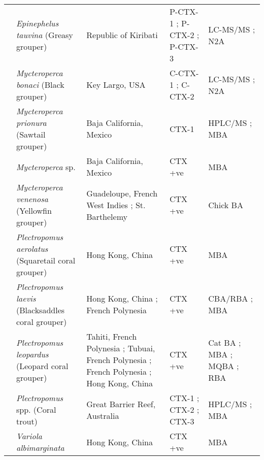 \documentclass[12pt]{article}
\begin{document}
\begin{longtable}{ | p{2cm} | p{3cm} | p{4.5cm} | p{2cm} | p{3cm} | }
	& \emph{Epinephelus tauvina} (Greasy grouper) & Republic of Kiribati \cite{mak2013pacific} & P-CTX-1 \cite{mak2013pacific}; P-CTX-2 \cite{mak2013pacific}; P-CTX-3 \cite{mak2013pacific} & LC-MS/MS \cite{mak2013pacific}; N2A \cite{mak2013pacific} \\
	& \emph{Mycteroperca bonaci} (Black grouper) & Key Largo, USA \cite{dickey2008ciguatera} & C-CTX-1 \cite{dickey2008ciguatera}; C-CTX-2 \cite{dickey2008ciguatera} & LC-MS/MS \cite{dickey2008ciguatera}; N2A \cite{dickey2008ciguatera} \\
	& \emph{Mycteroperca prionura} (Sawtail grouper) & Baja California, Mexico \cite{sierra1998overview} & CTX-1 \cite{sierra1998overview} & HPLC/MS \cite{sierra1998overview}; MBA \cite{sierra1998overview} \\
	& \emph{Mycteroperca} sp. & Baja California, Mexico \cite{lechuga1995documented} & CTX +ve \cite{lechuga1995documented} & MBA \cite{lechuga1995documented} \\
	& \emph{Mycteroperca venenosa} (Yellowfin grouper) & Guadeloupe, French West Indies \cite{}; St. Barthelemy \cite{} & CTX +ve \cite{} & Chick BA \cite{}\\
	& \emph{Plectropomus aerolatus} (Squaretail coral grouper) & Hong Kong, China \cite{wong2005study} & CTX +ve \cite{wong2005study} & MBA \cite{wong2005study} \\
	& \emph{Plectropomus laevis} (Blacksaddles coral grouper) & Hong Kong, China \cite{wong2008features}; French Polynesia \cite{chinain2014mail} & CTX +ve \cite{wong2008features,chinain2014mail} & CBA/RBA \cite{chinain2014mail}; MBA \cite{wong2008features}\\
	& \emph{Plectropomus leopardus} (Leopard coral grouper) & Tahiti, French Polynesia \cite{pompon1983ciguatera}; Tubuai, French Polynesia \cite{darius2007ciguatera}; French Polynesia \cite{bagnis1987use}; Hong Kong, China \cite{wong2005study} & CTX +ve \cite{wong2005study,darius2007ciguatera,bagnis1987use,pompon1983ciguatera} & Cat BA \cite{bagnis1987use}; MBA \cite{wong2005study,bagnis1987use,pompon1983ciguatera}; MQBA \cite{bagnis1987use}; RBA \cite{darius2007ciguatera} \\
	& \emph{Plectropomus} spp. (Coral trout) & Great Barrier Reef, Australia \cite{lewis1992multiple} & CTX-1 \cite{lewis1992multiple}; CTX-2 \cite{lewis1992multiple}; CTX-3 \cite{lewis1992multiple} & HPLC/MS \cite{lewis1992multiple}; MBA \cite{lewis1992multiple} \\
	& \emph{Variola albimarginata} & Hong Kong, China \cite{wong2008features} & CTX +ve \cite{wong2008features} & MBA \cite{wong2008features} \\

\end{longtable}
\end{document}
